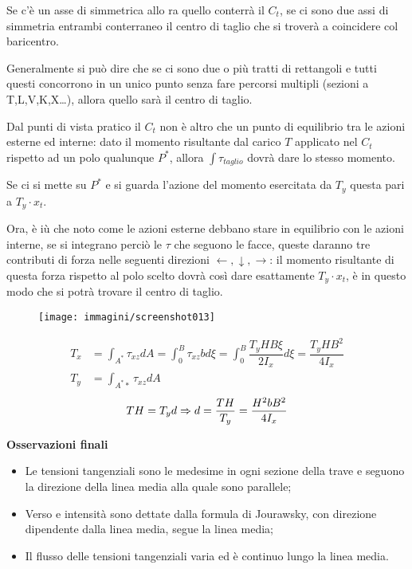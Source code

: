 \documentclass{article}
\begin{document}
\begin{adjustwidth}{2in}{}
    	Se c'è un asse di simmetrica allo ra quello conterrà il $C_t$, se ci sono due assi di simmetria entrambi conterraneo il centro di taglio che si troverà a coincidere col baricentro.
    	
    	Generalmente si può dire che se ci sono due o più tratti di rettangoli e tutti questi concorrono in un unico punto senza fare percorsi multipli (sezioni a
    	T,L,V,K,X…), allora quello sarà il centro di taglio. \newline 
    	
    	Dal punti di vista pratico il $C_t$ non è altro che un punto di equilibrio tra le azioni esterne ed interne: dato il momento risultante dal carico $T$ applicato nel $C_t$ rispetto ad un polo qualunque $P^*$, allora \( \int\tau_{taglio}\) dovrà dare lo stesso momento. \newline 
    	
    	Se ci si mette su $P^*$ e si guarda l'azione del momento esercitata da $T_y$ questa pari a \(T_y\cdot x_t\). 
    	
    	Ora, è iù che noto come le azioni esterne debbano stare in equilibrio con le azioni interne, se si integrano perciò le $\tau$ che seguono le facce, queste daranno tre contributi di forza nelle seguenti direzioni $\leftarrow, \downarrow, \rightarrow$: il momento risultante di questa forza rispetto al polo scelto dovrà così dare esattamente \(T_y\cdot x_t\), è in questo modo che si potrà trovare il centro di taglio. 
    	
\begin{figure}[H]
	\centering
	\texttt{[image: immagini/screenshot013]}
	\label{fig:screenshot013}
\end{figure}

    	
    	\[ \begin{aligned}
    		T_x & = \int_{A^*}\tau_{xz}dA = \int_{0}^{B}\tau_{xz}bd\xi =\int_{0}^{B}\dfrac{T_yHB\xi}{2I_x}d\xi = \dfrac{T_yHB^2}{4I_x} \\
    		T_y & = \int_{A^**}\tau_{xz}dA
    	\end{aligned} \]
    	\[ TH = T_yd \Rightarrow d = {TH\over T_y} = \dfrac{H^2bB^2}{4I_x}\]
		
		\textbf{{\Large Osservazioni finali}} \newline
		\begin{itemize}
			\item Le tensioni tangenziali sono le medesime in ogni sezione della trave e seguono la direzione della linea media
			alla quale sono parallele;
			\item Verso
			e intensità sono dettate dalla formula di Jourawsky, con direzione dipendente dalla linea media, segue la linea media;
			\item Il
			flusso delle tensioni tangenziali varia ed è continuo lungo la linea media.
			

\end{itemize}
\end{adjustwidth}
\end{document}
